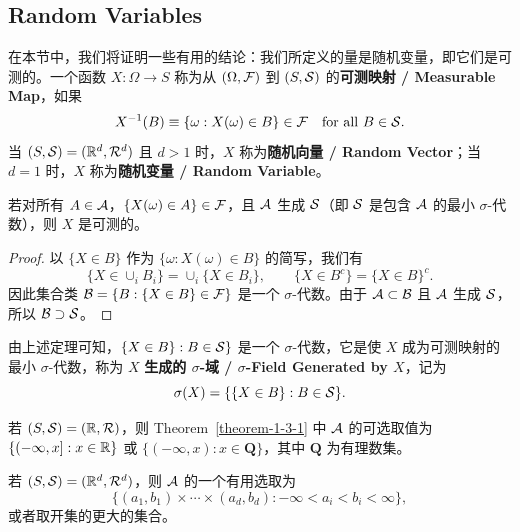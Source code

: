 \clearpage

\subsection{Random Variables}

在本节中，我们将证明一些有用的结论：我们所定义的量是随机变量，即它们是可测的。一个函数 $X : \Omega \to S$ 称为从 $(\Omega, \mathcal{F})$ 到 $(S, \mathcal{S})$ 的{\normalfont\bfseries 可测映射 / Measurable Map}，如果
\[
    X^{-1}(B) \equiv \{ \omega : X(\omega) \in B \} \in \mathcal{F} \quad \text{for all } B \in \mathcal{S}.
\]
当 $(S,\mathcal{S}) = (\mathbb{R}^d, \mathcal{R}^d)$ 且 $d > 1$ 时，$X$ 称为{\normalfont\bfseries 随机向量 / Random Vector}；当 $d=1$ 时，$X$ 称为{\normalfont\bfseries 随机变量 / Random Variable}。

\begin{theorem}\label{theorem-1-3-1}
    若对所有 $A \in \mathcal{A}$，$\{X(\omega) \in A\} \in \mathcal{F}$，且 $\mathcal{A}$ 生成 $\mathcal{S}$（即 $\mathcal{S}$ 是包含 $\mathcal{A}$ 的最小 $\sigma$-代数），则 $X$ 是可测的。
\end{theorem}

\begin{proof}
    以 $\{X \in B\}$ 作为 $\{\omega : X(\omega) \in B\}$ 的简写，我们有
    \[
        \{X \in \cup_i B_i\} = \cup_i \{X \in B_i\},
        \qquad
        \{X \in B^c\} = \{X \in B\}^c.
    \]
    因此集合类 $\mathcal{B} = \{B : \{X \in B\} \in \mathcal{F}\}$ 是一个 $\sigma$-代数。由于 $\mathcal{A} \subset \mathcal{B}$ 且 $\mathcal{A}$ 生成 $\mathcal{S}$，所以 $\mathcal{B} \supset \mathcal{S}$。
\end{proof}

由上述定理可知，$\{X \in B\} : B \in \mathcal{S}\}$ 是一个 $\sigma$-代数，它是使 $X$ 成为可测映射的最小 $\sigma$-代数，称为 $X$ {\normalfont\bfseries 生成的 $\sigma$-域 / $\sigma$-Field Generated by $X$}，记为
\begin{equation}\label{eq-1-3-1}
    \sigma(X) = \{\{X \in B\} : B \in \mathcal{S}\}.
\end{equation}

\begin{example}
    若 $(S,\mathcal{S}) = (\mathbb{R}, \mathcal{R})$，则 Theorem~\ref{theorem-1-3-1} 中 $\mathcal{A}$ 的可选取值为 $\{(-\infty,x] : x \in \mathbb{R}\}$ 或 $\{(-\infty,x) : x \in \mathbf{Q}\}$，其中 $\mathbf{Q}$ 为有理数集。
\end{example}

\begin{example}
    若 $(S,\mathcal{S}) = (\mathbb{R}^d, \mathcal{R}^d)$，则 $\mathcal{A}$ 的一个有用选取为
    \[
        \{(a_1,b_1) \times \cdots \times (a_d,b_d) : -\infty < a_i < b_i < \infty\},
    \]
    或者取开集的更大的集合。
\end{example}


